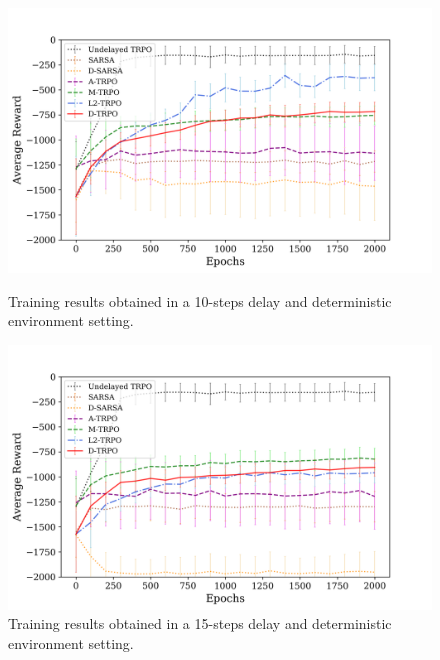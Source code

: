             \begin{figure}[hbtp]
                \centering
                \includegraphics[width=15cm, keepaspectratio]{images/results/delay10_comparisons_1.png}
                \caption{Training results obtained in a 10-steps delay and deterministic environment setting.}
                \label{fig:results_delay10_1}
                
                \vspace{1.5cm}
                
                \includegraphics[width=15cm, keepaspectratio]{images/results/delay15_comparisons_1.png}
                \caption{Training results obtained in a 15-steps delay and deterministic environment setting.}
                \label{fig:results_delay15_1}
            \end{figure}
        
        \newpage
